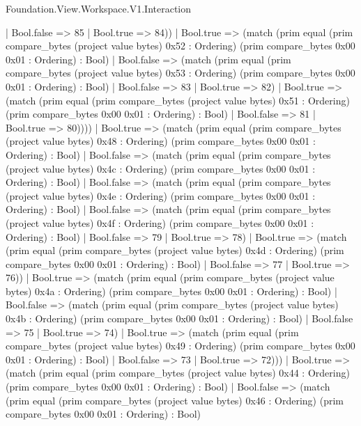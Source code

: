 \begin{lexlean}{Foundation.View.Workspace.V1.Interaction}
\begin{semanticmodule}
{                    | Bool.false => 85
                    | Bool.true => 84))
                | Bool.true => (match (prim equal (prim compare_bytes (project value bytes) 0x52 : Ordering) (prim compare_bytes 0x00 0x01 : Ordering) : Bool)
                  | Bool.false => (match (prim equal (prim compare_bytes (project value bytes) 0x53 : Ordering) (prim compare_bytes 0x00 0x01 : Ordering) : Bool)
                    | Bool.false => 83
                    | Bool.true => 82)
                  | Bool.true => (match (prim equal (prim compare_bytes (project value bytes) 0x51 : Ordering) (prim compare_bytes 0x00 0x01 : Ordering) : Bool)
                    | Bool.false => 81
                    | Bool.true => 80))))
            | Bool.true => (match (prim equal (prim compare_bytes (project value bytes) 0x48 : Ordering) (prim compare_bytes 0x00 0x01 : Ordering) : Bool)
              | Bool.false => (match (prim equal (prim compare_bytes (project value bytes) 0x4c : Ordering) (prim compare_bytes 0x00 0x01 : Ordering) : Bool)
                | Bool.false => (match (prim equal (prim compare_bytes (project value bytes) 0x4e : Ordering) (prim compare_bytes 0x00 0x01 : Ordering) : Bool)
                  | Bool.false => (match (prim equal (prim compare_bytes (project value bytes) 0x4f : Ordering) (prim compare_bytes 0x00 0x01 : Ordering) : Bool)
                    | Bool.false => 79
                    | Bool.true => 78)
                  | Bool.true => (match (prim equal (prim compare_bytes (project value bytes) 0x4d : Ordering) (prim compare_bytes 0x00 0x01 : Ordering) : Bool)
                    | Bool.false => 77
                    | Bool.true => 76))
                | Bool.true => (match (prim equal (prim compare_bytes (project value bytes) 0x4a : Ordering) (prim compare_bytes 0x00 0x01 : Ordering) : Bool)
                  | Bool.false => (match (prim equal (prim compare_bytes (project value bytes) 0x4b : Ordering) (prim compare_bytes 0x00 0x01 : Ordering) : Bool)
                    | Bool.false => 75
                    | Bool.true => 74)
                  | Bool.true => (match (prim equal (prim compare_bytes (project value bytes) 0x49 : Ordering) (prim compare_bytes 0x00 0x01 : Ordering) : Bool)
                    | Bool.false => 73
                    | Bool.true => 72)))
              | Bool.true => (match (prim equal (prim compare_bytes (project value bytes) 0x44 : Ordering) (prim compare_bytes 0x00 0x01 : Ordering) : Bool)
                | Bool.false => (match (prim equal (prim compare_bytes (project value bytes) 0x46 : Ordering) (prim compare_bytes 0x00 0x01 : Ordering) : Bool)
}
\end{semanticmodule}
\end{lexlean}

